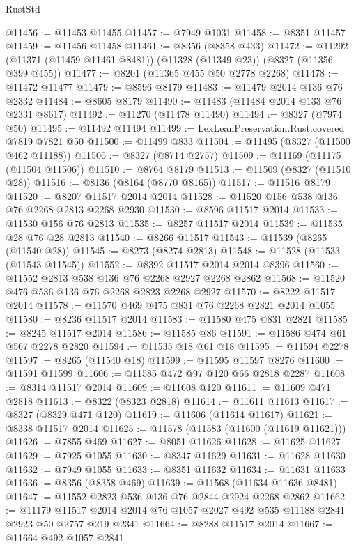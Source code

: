 \begin{lexlean}{RustStd}
\begin{coremodule}
{\begin{coremodule}
{{{{{{{{{{{{{{{{{{{{{{{{{{{{{{{{{{{{{{{{{{{{{{{{{{{{{{@11456 := @11453 @11455
@11457 := @7949 @1031
@11458 := @8351 @11457
@11459 := @11456 @11458
@11461 := @8356 (@8358 @433)
@11472 := @11292 (@11371 (@11459 @11461 @8481)) (@11328 (@11349 @23)) (@8327 (@11356 @399 @455))
@11477 := @8201 (@11365 @455 @50 @2778 @2268)
@11478 := @11472 @11477
@11479 := @8596 @8179
@11483 := @11479 @2014 @136 @76 @2332
@11484 := @8605 @8179
@11490 := @11483 (@11484 @2014 @133 @76 @2331 @8617)
@11492 := @11270 (@11478 @11490)
@11494 := @8327 (@7974 @50)
@11495 := @11492 @11494
@11499 := LexLeanPreservation.Rust.covered @7819 @7821 @50
@11500 := @11499 @833
@11504 := @11495 (@8327 (@11500 @462 @11188))
@11506 := @8327 (@8714 @2757)
@11509 := @11169 (@11175 (@11504 @11506))
@11510 := @8764 @8179
@11513 := @11509 (@8327 (@11510 @28))
@11516 := @8136 (@8164 (@8770 @8165))
@11517 := @11516 @8179
@11520 := @8207 @11517 @2014 @2014
@11528 := @11520 @156 @538 @136 @76 @2268 @2813 @2268 @2930
@11530 := @8596 @11517 @2014
@11533 := @11530 @156 @76 @2813
@11535 := @8257 @11517 @2014
@11539 := @11535 @28 @76 @28 @2813
@11540 := @8266 @11517
@11543 := @11539 (@8265 (@11540 @28))
@11545 := @8273 (@8274 @2813)
@11548 := @11528 (@11533 (@11543 @11545))
@11552 := @8392 @11517 @2014 @2014 @8396
@11560 := @11552 @2813 @538 @136 @76 @2268 @2927 @2268 @2862
@11568 := @11520 @476 @536 @136 @76 @2268 @2823 @2268 @2927
@11570 := @8222 @11517 @2014
@11578 := @11570 @469 @475 @831 @76 @2268 @2821 @2014 @1055
@11580 := @8236 @11517 @2014
@11583 := @11580 @475 @831 @2821
@11585 := @8245 @11517 @2014
@11586 := @11585 @86
@11591 := @11586 @474 @61 @567 @2278 @2820
@11594 := @11535 @18 @61 @18
@11595 := @11594 @2278
@11597 := @8265 (@11540 @18)
@11599 := @11595 @11597 @8276
@11600 := @11591 @11599
@11606 := @11585 @472 @97 @120 @66 @2818 @2287
@11608 := @8314 @11517 @2014
@11609 := @11608 @120
@11611 := @11609 @471 @2818
@11613 := @8322 (@8323 @2818)
@11614 := @11611 @11613
@11617 := @8327 (@8329 @471 @120)
@11619 := @11606 (@11614 @11617)
@11621 := @8338 @11517 @2014
@11625 := @11578 (@11583 (@11600 (@11619 @11621)))
@11626 := @7855 @469
@11627 := @8051 @11626
@11628 := @11625 @11627
@11629 := @7925 @1055
@11630 := @8347 @11629
@11631 := @11628 @11630
@11632 := @7949 @1055
@11633 := @8351 @11632
@11634 := @11631 @11633
@11636 := @8356 (@8358 @469)
@11639 := @11568 (@11634 @11636 @8481)
@11647 := @11552 @2823 @536 @136 @76 @2844 @2924 @2268 @2862
@11662 := @11179
    @11517
    @2014
    @2014
    @76
    @1057
    @2027
    @492
    @535
    @11188
    @2841
    @2923
    @50
    @2757
    @219
    @2341
@11664 := @8288 @11517 @2014
@11667 := @11664 @492 @1057 @2841
}}}}}}}}}}}}}}}}}}}}}}}}}}}}}}}}}}}}}}}}}}}}}}}}}}}}}}
\end{coremodule}}
\end{coremodule}
\end{lexlean}
